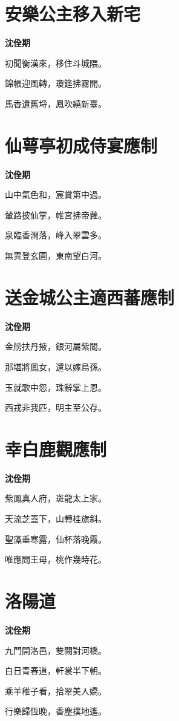 \documentclass[12pt,a4paper]{ctexbook}
\begin{document}
\section{安樂公主移入新宅}
\textbf{沈佺期}\par\vspace{0.5em}
初聞衡漢來，移住斗城隈。\par
錦帳迎風轉，瓊筵拂霧開。\par
馬香遺舊埒，鳳吹繞新臺。\par

\section{仙萼亭初成侍宴應制}
\textbf{沈佺期}\par\vspace{0.5em}
山中氣色和，宸賞第中過。\par
輦路披仙掌，帷宮拂帝蘿。\par
泉臨香澗落，峰入翠雲多。\par
無異登玄圃，東南望白河。\par

\section{送金城公主適西蕃應制}
\textbf{沈佺期}\par\vspace{0.5em}
金牓扶丹掖，銀河屬紫閽。\par
那堪將鳳女，還以嫁烏孫。\par
玉就歌中怨，珠辭掌上恩。\par
西戎非我匹，明主至公存。\par

\section{幸白鹿觀應制}
\textbf{沈佺期}\par\vspace{0.5em}
紫鳳真人府，斑龍太上家。\par
天流芝蓋下，山轉桂旗斜。\par
聖藻垂寒露，仙杯落晚霞。\par
唯應問王母，桃作幾時花。\par

\section{洛陽道}
\textbf{沈佺期}\par\vspace{0.5em}
九門開洛邑，雙闕對河橋。\par
白日青春道，軒裳半下朝。\par
乘羊稚子看，拾翠美人嬌。\par
行樂歸恆晚，香塵撲地遙。\par
\end{document}
